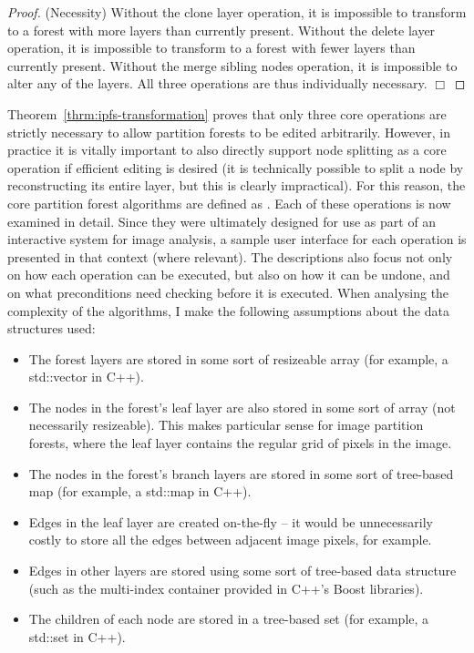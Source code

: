 \begin{proof}
(Necessity) Without the clone layer operation, it is impossible to transform to a forest with more layers than currently present. Without the delete layer operation, it is impossible to transform to a forest with fewer layers than currently present. Without the merge sibling nodes operation, it is impossible to alter any of the layers. All three operations are thus individually necessary. $\Box$
\end{proof}

\noindent Theorem~\ref{thrm:ipfs-transformation} proves that only three core operations are strictly necessary to allow partition forests to be edited arbitrarily. However, in practice it is vitally important to also directly support node splitting as a core operation if efficient editing is desired (it is technically possible to split a node by reconstructing its entire layer, but this is clearly impractical). For this reason, the core partition forest algorithms are defined as . Each of these operations is now examined in detail. Since they were ultimately designed for use as part of an interactive system for image analysis, a sample user interface for each operation is presented in that context (where relevant). The descriptions also focus not only on how each operation can be executed, but also on how it can be undone, and on what preconditions need checking before it is executed. When analysing the complexity of the algorithms, I make the following assumptions about the data structures used:

\begin{itemize}
\item The forest layers are stored in some sort of resizeable array (for example, a std::vector in C++).
\item The nodes in the forest's leaf layer are also stored in some sort of array (not necessarily resizeable). This makes particular sense for image partition forests, where the leaf layer contains the regular grid of pixels in the image.
\item The nodes in the forest's branch layers are stored in some sort of tree-based map (for example, a std::map in C++).
\item Edges in the leaf layer are created on-the-fly -- it would be unnecessarily costly to store all the edges between adjacent image pixels, for example.
\item Edges in other layers are stored using some sort of tree-based data structure (such as the multi-index container provided in C++'s Boost libraries).
\item The children of each node are stored in a tree-based set (for example, a std::set in C++).
\end{itemize}

